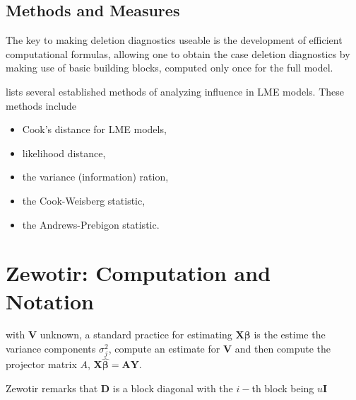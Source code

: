 \documentclass[12pt, a4paper]{article}
\begin{document}
\subsection{Methods and Measures}
The key to making deletion diagnostics useable is the development of efficient computational formulas, allowing one to obtain the  case deletion diagnostics by making use of basic building blocks, computed only once for the full model.

\citet{Zewotir} lists several established methods of analyzing influence in LME models. These methods include \begin{itemize}
	\item Cook's distance for LME models,
	\item {} likelihood distance,
	\item the variance (information) ration,
	\item the  Cook-Weisberg statistic,
	\item the  Andrews-Prebigon statistic.
\end{itemize}




\section{Zewotir: Computation and Notation } %
with $\boldsymbol{V}$ unknown, a standard practice for estimating $\boldsymbol{X \beta}$ is the estime the variance components $\sigma^2_j$,
compute an estimate for $\boldsymbol{V}$ and then compute the projector matrix $A$, $\boldsymbol{X \hat{\beta}}  = \boldsymbol{AY}$.


Zewotir remarks that $\boldsymbol{D}$ is a block diagonal with the $i-$th block being $u \boldsymbol{I}$
\end{document}
